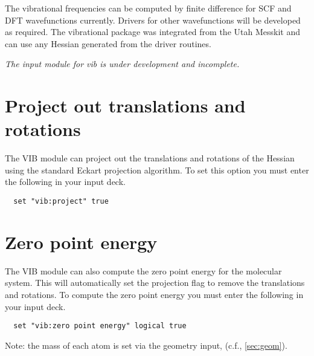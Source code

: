 The vibrational frequencies can be computed by finite difference for
SCF and DFT wavefunctions currently.  Drivers for other wavefunctions
will be developed as required.  The vibrational package was integrated
from the Utah Messkit and can use any Hessian generated from the
driver routines.

{\it The input module for vib is under development and incomplete.}

\section{Project out translations and rotations}

The VIB module can project out the translations and rotations of the
Hessian using the standard Eckart projection algorithm.  To set this
option you must enter the following in your input deck.

\begin{verbatim}
  set "vib:project" true
\end{verbatim}

\section{Zero point energy}

The VIB module can also compute the zero point energy for the
molecular system.  This will automatically set the projection flag to
remove the translations and rotations.   To compute the zero point energy
you must enter the following in your input deck.

\begin{verbatim}
  set "vib:zero point energy" logical true
\end{verbatim}

Note: the mass of each atom is set via the geometry input, (c.f.,
\ref{sec:geom}). 
